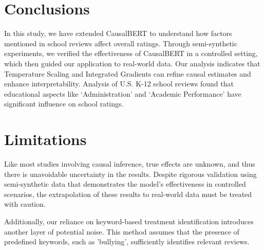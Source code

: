 \documentclass[11pt]{article}
\begin{document}
\vspace{-.1cm}

\section{Conclusions}
\label{sec:conclusions}
In this study, we have extended CausalBERT to understand how factors mentioned in school reviews affect overall ratings. Through semi-synthetic experiments, we verified the effectiveness of CausalBERT in a controlled setting, which then guided our application to real-world data. Our analysis indicates that Temperature Scaling and Integrated Gradients can refine causal estimates and enhance interpretability. 
Analysis of U.S. K-12 school reviews found that educational aspects like `Administration' and `Academic Performance' have significant influence on school ratings.






\section{Limitations}
\label{sec:limitations}
Like most studies involving causal inference, true effects are unknown, and thus there is unavoidable uncertainty in the results.  
Despite rigorous validation using semi-synthetic data that demonstrates the model's effectiveness in controlled scenarios, the extrapolation of these results to real-world data must be treated with caution. 


Additionally, our reliance on keyword-based treatment identification introduces another layer of potential noise. This method assumes that the presence of predefined keywords, such as 'bullying', sufficiently identifies relevant reviews. 
\end{document}
